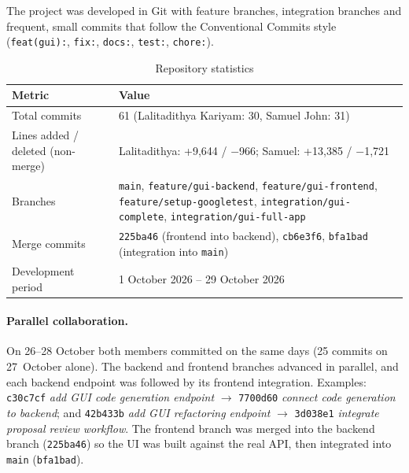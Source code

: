 \documentclass[12pt,a4paper,oneside]{book}
\begin{document}
The project was developed in Git with feature branches, integration branches
and frequent, small commits that follow the Conventional Commits style
(\texttt{feat(gui):}, \texttt{fix:}, \texttt{docs:}, \texttt{test:},
\texttt{chore:}).

\begin{table}[htbp]
\centering\small
\begin{tabular}{|p{6cm}|p{7.5cm}|}
\hline
\textbf{Metric} & \textbf{Value} \\ \hline
Total commits & 61 (Lalitadithya Kariyam: 30, Samuel John: 31) \\ \hline
Lines added / deleted (non-merge) & Lalitadithya: +9{,}644 / $-$966; Samuel: +13{,}385 / $-$1{,}721 \\ \hline
Branches & \texttt{main}, \texttt{feature/\allowbreak{}gui-backend}, \texttt{feature/\allowbreak{}gui-frontend}, \texttt{feature/\allowbreak{}setup-googletest}, \texttt{integration/\allowbreak{}gui-complete}, \texttt{integration/\allowbreak{}gui-full-app} \\ \hline
Merge commits & \texttt{225ba46} (frontend into backend), \texttt{cb6e3f6}, \texttt{bfa1bad} (integration into \texttt{main}) \\ \hline
Development period & 1 October 2026 -- 29 October 2026 \\ \hline
\end{tabular}
\caption{Repository statistics}
\label{tab:ca-gitstats}
\end{table}

\paragraph{Parallel collaboration.}
On 26--28 October both members committed on the same days (25 commits on
27~October alone). The backend and frontend branches advanced in parallel, and
each backend endpoint was followed by its frontend integration. Examples:
\texttt{c30c7cf} \emph{add GUI code generation endpoint} $\rightarrow$
\texttt{7700d60} \emph{connect code generation to backend}; and
\texttt{42b433b} \emph{add GUI refactoring endpoint} $\rightarrow$
\texttt{3d038e1} \emph{integrate proposal review workflow}. The frontend
branch was merged into the backend branch (\texttt{225ba46}) so the UI was
built against the real API, then integrated into \texttt{main}
(\texttt{bfa1bad}).
\end{document}

